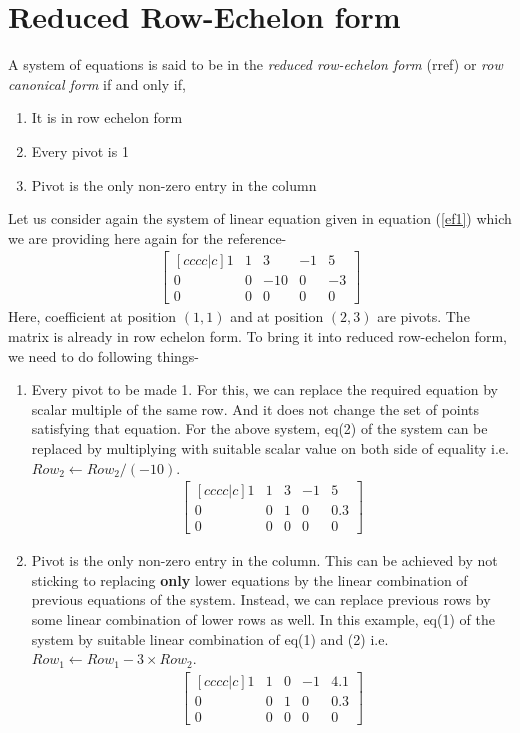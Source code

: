 \documentclass{article}
\begin{document}
\section{Reduced Row-Echelon form}
A system of equations is said to be in the \textit{reduced row-echelon form} (rref) or \textit{row canonical form} if and only if,
\begin{enumerate}
    \item It is in row echelon form
    \item Every pivot is 1
    \item Pivot is the only non-zero entry in the column
\end{enumerate}
Let us consider again the system of linear equation given in equation (\ref{ef1}) which we are providing here again for the reference-
\begin{align}
\begin{bmatrix}[cccc|c] 
1 & 1 & 3 & -1 & 5 \\
0 & 0 & -10 & 0 & -3 \\
0 & 0 & 0 & 0 & 0 
\end{bmatrix}\nonumber
\end{align}
Here, coefficient at position $(1,1)$ and at position $(2,3)$ are pivots. The matrix is already in row echelon form. To bring it into reduced row-echelon form, we need to do following things-
\begin{enumerate}
    \item Every pivot to be made 1. For this, we can replace the required equation by scalar multiple of the same row. And it does not change the set of points satisfying that equation. For the above system, eq(2) of the system can be replaced by multiplying with suitable scalar value on both side of equality i.e. $Row_2\leftarrow Row_2/(-10)$. 
\begin{align}
\begin{bmatrix}[cccc|c] 
1 & 1 & 3 & -1 & 5 \\
0 & 0 & 1 & 0 & 0.3 \\
0 & 0 & 0 & 0 & 0 
\end{bmatrix}\nonumber
\end{align}
    
    \item Pivot is the only non-zero entry in the column. This can be achieved by not sticking to replacing \textbf{only} lower equations by the linear combination of previous equations of the system. Instead, we can replace previous rows by some linear combination of lower rows as well. In this example, eq(1) of the system by suitable linear combination of eq(1) and (2) i.e. $Row_1\leftarrow Row_1-3\times Row_2$. \begin{align}
\begin{bmatrix}[cccc|c] 
1 & 1 & 0 & -1 & 4.1 \\
0 & 0 & 1 & 0 & 0.3 \\
0 & 0 & 0 & 0 & 0 
\end{bmatrix}\nonumber
\end{align}
\end{enumerate}
\end{document}
